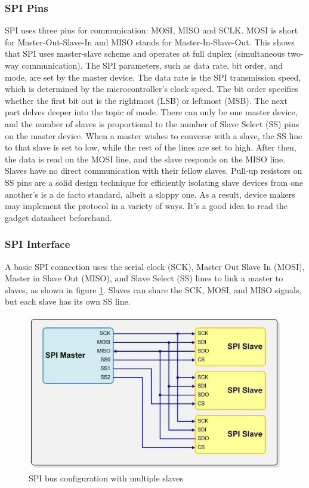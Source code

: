 \subsubsection{SPI Pins}
SPI uses three pins for communication:
 MOSI, MISO and SCLK. MOSI is short for 
Master-Out-Slave-In and MISO stands for 
Master-In-Slave-Out. This shows that SPI
 uses master-slave scheme and operates 
at full duplex (simultaneous two-way communication). \newline
The SPI parameters, such as data rate, bit order, and mode, are set by the master device. The data rate is the SPI transmission speed, which is determined by the microcontroller's clock speed. The bit order specifies whether the first bit out is the rightmost (LSB) or leftmost (MSB). The next part delves deeper into the topic of mode. There can only be one master device, and the number of slaves is proportional to the number of Slave Select (SS) pins on the master device. When a master wishes to converse with a slave, the SS line to that slave is set to low, while the rest of the lines are set to high. After then, the data is read on the MOSI line, and the slave responds on the MISO line. Slaves have no direct communication with their fellow slaves. Pull-up resistors on SS pins are a solid design technique for efficiently isolating slave devices from one another’s is a de facto standard, albeit a sloppy one. As a result, device makers may implement the protocol in a variety of ways. It's a good idea to read the gadget datasheet beforehand. \newline

\subsubsection{SPI Interface}
A basic SPI connection uses the serial clock (SCK), Master Out Slave In (MOSI), Master in Slave Out (MISO), and Slave Select (SS) lines to link a master to slaves, as shown in figure \ref{fig:spi-integration}. Slaves can share the SCK, MOSI, and MISO signals, but each slave has its own SS line.
\begin{figure}[h]
   \centering
    \includegraphics[width=.45\textwidth]{figure/3_7.jpg}
    \caption{SPI bus configuration with multiple slaves}
    \label{fig:spi-integration}
\end{figure}

